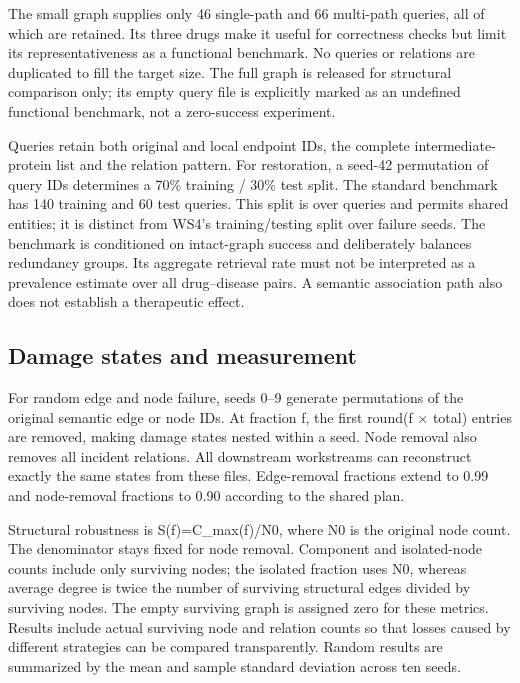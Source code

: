 The small graph supplies only 46 single-path and 66 multi-path queries,
all of which are retained. Its three drugs make it useful for
correctness checks but limit its representativeness as a functional
benchmark. No queries or relations are duplicated to fill the target
size. The full graph is released for structural comparison only; its
empty query file is explicitly marked as an undefined functional
benchmark, not a zero-success experiment.

Queries retain both original and local endpoint IDs, the complete
intermediate-protein list and the relation pattern. For restoration, a
seed-42 permutation of query IDs determines a 70\% training / 30\% test
split. The standard benchmark has 140 training and 60 test queries. This
split is over queries and permits shared entities; it is distinct from
WS4's training/testing split over failure seeds. The benchmark is
conditioned on intact-graph success and deliberately balances redundancy
groups. Its aggregate retrieval rate must not be interpreted as a
prevalence estimate over all drug--disease pairs. A semantic association
path also does not establish a therapeutic effect.

\subsection{Damage states and
measurement}\label{damage-states-and-measurement}

For random edge and node failure, seeds 0--9 generate permutations of
the original semantic edge or node IDs. At fraction f, the first round(f
$\times$ total) entries are removed, making damage states nested within a seed.
Node removal also removes all incident relations. All downstream
workstreams can reconstruct exactly the same states from these files.
Edge-removal fractions extend to 0.99 and node-removal fractions to 0.90
according to the shared plan.

Structural robustness is S(f)=\textbar C\_max(f)\textbar/N0, where N0 is
the original node count. The denominator stays fixed for node removal.
Component and isolated-node counts include only surviving nodes; the
isolated fraction uses N0, whereas average degree is twice the number of
surviving structural edges divided by surviving nodes. The empty
surviving graph is assigned zero for these metrics. Results include
actual surviving node and relation counts so that losses caused by
different strategies can be compared transparently. Random results are
summarized by the mean and sample standard deviation across ten seeds.
